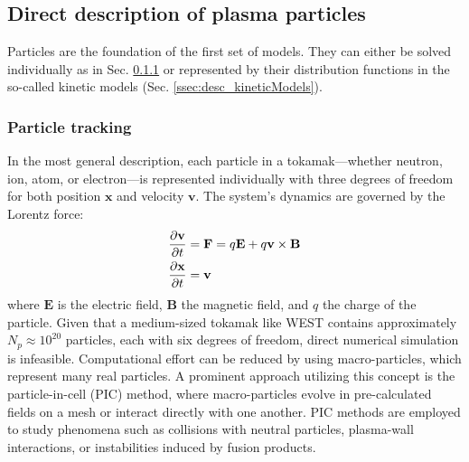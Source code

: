 \subsection{Direct description of plasma particles}
\label{sec:desc_directDesciption}
Particles are the foundation of the first set of models. They can either be solved individually as in Sec. \ref{ssec:desc_particleTracking} or represented by their distribution functions in the so-called kinetic models (Sec. \ref{ssec:desc_kineticModels}).

\subsubsection{Particle tracking}
\label{ssec:desc_particleTracking}
In the most general description, each particle in a tokamak—whether neutron, ion, atom, or electron—is represented individually with three degrees of freedom for both position $\mathbf{x}$ and velocity $\mathbf{v}$. The system's dynamics are governed by the Lorentz force:
\begin{align}
	\pdv{\mathbf{v}}{t} &= \mathbf{F} = q\mathbf{E} + q\mathbf{v} \times \mathbf{B} \label{eq:desc_particle}\\
	\pdv{\mathbf{x}}{t} &= \mathbf{v}
\end{align}
where $\mathbf{E}$ is the electric field, $\mathbf{B}$ the magnetic field, and $q$ the charge of the particle. \newline
Given that a medium-sized tokamak like WEST contains approximately $N_p \approx 10^{20}$ particles, each with six degrees of freedom, direct numerical simulation is infeasible. Computational effort can be reduced by using macro-particles, which represent many real particles. A prominent approach utilizing this concept is the particle-in-cell (PIC) method\cite{tskhakaya2007particle}, where macro-particles evolve in pre-calculated fields on a mesh or interact directly with one another. PIC methods are employed to study phenomena such as collisions with neutral particles\cite{birdsall1991particle}, plasma-wall interactions\cite{khaziev2018hpic}, or instabilities induced by fusion products\cite{cook2013particle}.




